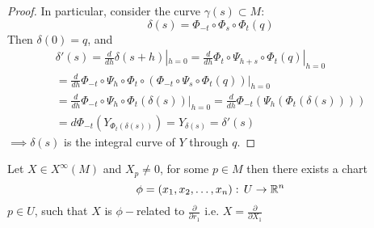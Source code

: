 \begin{teorema}
\begin{proof}
    In particular, consider the curve $\gamma(s) \subset M$:
    $$\delta(s) = \Phi_{-t} \circ \Phi_s \circ \Phi_t(q) $$
    Then $\delta(0) = q$, and 
    \begin{gather*}
    \delta'(s) = \frac{d}{dh}\delta(s+h) |_{h=0} =  \frac{d}{dh}\Phi_t \circ \Psi_{h+s} \circ \Phi_t (q) |_{h=0}\\
    =  \frac{d}{dh} \Phi_{-t} \circ \Psi_h \circ \Phi_t \circ \left( \Phi_{-t} \circ \Psi_s \circ \Phi_t(q)\right)|_{h=0}\\
=  \frac{d}{dh} \Phi_{-t} \circ \Psi_h \circ \Phi_t (\delta(s))|_{h=0}   =  \frac{d}{dh} \Phi_{-t}\left( \Psi_h\left( \Phi_t \left(\delta(s) \right)\right)\right)\\
= d\Phi_{-t} (Y_{\Phi_t(\delta(s))}) = Y_{\delta(s)} = \delta'(s)
\end{gather*}
$\implies \delta(s)$  is the integral curve of $Y$ through $q$.
    \end{proof}
\end{teorema}

\begin{teorema}
    Let $X\in X^\infty(M)$ and $X_p\neq 0 $, for some $p\in M$ then there exists a chart 
    $$\phi=(x_1,x_2,\ldots,x_n):\, U\to \mathbb{R}^n$$
    $p\in U$, such that $X$ is $\phi-$related to $\frac{\partial}{\partial r_1}$ i.e. $X=\frac{\partial}{\partial X_1}$
\end{teorema}
